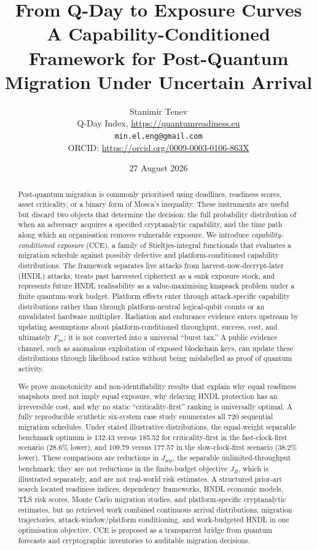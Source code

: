 \documentclass[10pt]{article}
\title{\vspace{-1.2cm}\textcolor{qrpblue}{\bfseries\LARGE From Q-Day to Exposure Curves}\\[5pt]
\Large A Capability-Conditioned Framework for Post-Quantum Migration Under Uncertain Arrival}
\author{Stanimir Tenev\\
\small Q-Day Index, \url{https://quantumreadiness.eu}\\
\small \texttt{min.el.eng@gmail.com}\\
\small ORCID: \url{https://orcid.org/0009-0003-0106-863X}}
\date{27 August 2026}
\begin{document}
\maketitle
\vspace{-0.5em}

\begin{abstract}
Post-quantum migration is commonly prioritised using deadlines, readiness scores, asset criticality, or a binary form of Mosca's inequality. These instruments are useful but discard two objects that determine the decision: the full probability distribution of when an adversary acquires a specified cryptanalytic capability, and the time path along which an organisation removes vulnerable exposure. We introduce \emph{capability-conditioned exposure} (CCE), a family of Stieltjes-integral functionals that evaluates a migration schedule against possibly defective and platform-conditioned capability distributions. The framework separates live attacks from harvest-now-decrypt-later (HNDL) attacks, treats past harvested ciphertext as a sunk exposure stock, and represents future HNDL realisability as a value-maximising knapsack problem under a finite quantum-work budget. Platform effects enter through attack-specific capability distributions rather than through platform-neutral logical-qubit counts or an unvalidated hardware multiplier. Radiation and endurance evidence enters upstream by updating assumptions about platform-conditioned throughput, success, cost, and ultimately $F_{pa}$; it is not converted into a universal ``burst tax.'' A public evidence channel, such as anomalous exploitation of exposed blockchain keys, can update these distributions through likelihood ratios without being mislabelled as proof of quantum activity.

We prove monotonicity and non-identifiability results that explain why equal readiness snapshots need not imply equal exposure, why delaying HNDL protection has an irreversible cost, and why no static ``criticality-first'' ranking is universally optimal. A fully reproducible synthetic six-system case study enumerates all 720 sequential migration schedules. Under stated illustrative distributions, the equal-weight separable benchmark optimum is 132.43 versus 185.52 for criticality-first in the fast-clock-first scenario (28.6\% lower), and 109.79 versus 177.57 in the slow-clock-first scenario (38.2\% lower). These comparisons are reductions in $J_{\mathrm{sep}}$, the separable unlimited-throughput benchmark; they are not reductions in the finite-budget objective $J_B$, which is illustrated separately, and are not real-world risk estimates. A structured prior-art search located readiness indices, dependency frameworks, HNDL economic models, TLS risk scores, Monte Carlo migration studies, and platform-specific cryptanalytic estimates, but no retrieved work combined continuous arrival distributions, migration trajectories, attack-window/platform conditioning, and work-budgeted HNDL in one optimisation objective. CCE is proposed as a transparent bridge from quantum forecasts and cryptographic inventories to auditable migration decisions.
\end{abstract}
\end{document}
